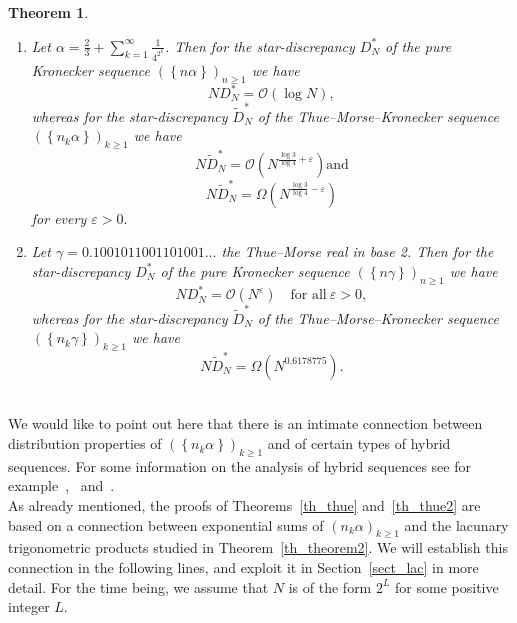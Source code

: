 \documentclass[12pt]{amsart}
\newtheorem{theorem}{Theorem}
\newcommand {\ve} {\varepsilon}
\begin{document}
\begin{theorem} \label{th_thue4}
~\
\begin{enumerate}
\item [a)] Let $\alpha = \frac{2}{3} + \sum^{\infty}_{k=1} \frac{1}{4^{2^{k}}}$. Then for the star-discrepancy $D^{*}_{N}$ of the pure Kronecker sequence $\left(\left\{n \alpha\right\}\right)_{n \geq 1}$ we have
$$N D^{*}_{N} = \mathcal{O} \left(\log N\right),$$
whereas for the star-discrepancy $\widetilde{D}_{N}^{*}$ of the Thue--Morse--Kronecker sequence $\left(\left\{n_{k} \alpha\right\}\right)_{k \geq 1}$ we have
$$N \widetilde{D}_{N}^{*}= \mathcal{O} \left(N^{\frac{\log 3}{\log 4}+ \ve}\right) \mbox{and}$$
$$N \widetilde{D}_{N}^{*}= \Omega \left(N^{\frac{\log 3}{\log 4} - \ve}\right)$$
for every $\ve > 0.$
\item [b)] Let $\gamma=0.1001011001101001\ldots$ the Thue--Morse real in base 2. Then for the star-discrepancy $D^{*}_{N}$ of the pure Kronecker sequence $\left(\left\{n \gamma\right\}\right)_{n \geq 1}$ we have
$$N D_{N}^{*} = \mathcal{O} \left(N^{\ve}\right) \quad \mbox{for all}~ \ve > 0,$$
whereas for the star-discrepancy $\widetilde{D}_{N}^{*}$ of the Thue--Morse--Kronecker sequence $\left(\left\{n_{k} \gamma\right\}\right)_{k \geq 1}$ we have
$$N \widetilde{D}_{N}^{*} = \Omega \left(N^{0.6178775}\right).$$
\end{enumerate}
\end{theorem}
~\\

We would like to point out here that there is an intimate connection between distribution properties of $\left(\left\{n_{k} \alpha\right\}\right)_{k \geq 1}$ and of certain types of hybrid sequences. For some information on the analysis of hybrid sequences see for example~\cite{hokr},~\cite{hola} and~\cite{larch}.\\

As already mentioned, the proofs of Theorems~\ref{th_thue} and~\ref{th_thue2} are based on a connection between exponential sums of $(n_k \alpha)_{k \geq 1}$ and the lacunary trigonometric products studied in Theorem~\ref{th_theorem2}. We will establish this connection in the following lines, and exploit it in Section~\ref{sect_lac} in more detail. For the time being, we assume that $N$ is of the form $2^L$ for some positive integer $L$.\\
\end{document}
